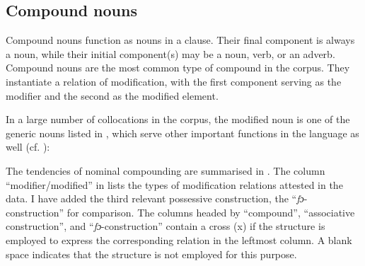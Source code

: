 \subsection{Compound nouns}\label{sec:4.4.2}

Compound nouns function as nouns in a clause. Their final component is always a noun, while their initial component(s) may be a noun, verb, or an adverb. Compound nouns are the most common type of compound in the corpus. They instantiate a relation of modification, with the first component serving as the modifier and the second as the modified element. 


In a large number of collocations in the corpus, the modified noun is one of the generic nouns listed in , which serve other important functions in the language as well (cf. \citealt[252]{Faraclas1996}):


The tendencies of nominal compounding are summarised in . The column “modifier/modified” in  lists the types of modification relations attested in the data. I have added the third relevant possessive construction, the “\textit{fɔ}{}-construction” for comparison. The columns headed by “compound”, “associative construction”, and “\textit{fɔ}{}-construction” contain a cross (x) if the structure is employed to express the corresponding relation in the leftmost column. A blank space indicates that the structure is not employed for this purpose. 

